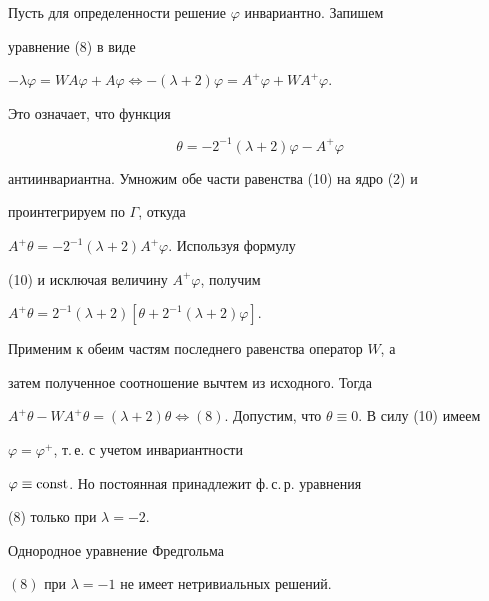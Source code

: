 \begin{pf}


Пусть для определенности решение $\varphi$  инвариантно. Запишем


уравнение (8) в виде


$-\lambda\varphi=WA\varphi+A\varphi \Longleftrightarrow


-(\lambda+2)\varphi=A^{+}\varphi+WA^{+}\varphi$.


Это означает, что функция


\begin{equation}


\theta=-2^{-1}(\lambda+2)\varphi-A^{+}\varphi


\end{equation}


антиинвариантна. Умножим обе части равенства (10) на ядро (2) и


проинтегрируем по $\Gamma$, откуда


$A^{+}\theta=-2^{-1}(\lambda+2)A^{+}\varphi$. Используя формулу


(10) и исключая величину $A^{+}\varphi$, получим


$A^{+}\theta=2^{-1}(\lambda+2)[\theta+2^{-1}(\lambda+2)\varphi]$.


Применим к обеим частям последнего равенства оператор $W$, а


затем полученное соотношение вычтем из исходного. Тогда


$A^{+}\theta-WA^{+}\theta=(\lambda+2)\theta \Longleftrightarrow


(8)$. Допустим, что $\theta\equiv 0$. В силу (10) имеем


$\varphi=\varphi^{+}$, т.\,е. с учетом инвариантности


$\varphi\equiv \operatorname{const}$. Но постоянная принадлежит ф.\,с.\,р. уравнения


(8) только при $\lambda=-2$.


\end{pf}








\begin{lem}


Однородное уравнение Фредгольма


$(8)$ при $\lambda=-1$ не имеет нетривиальных решений.


\end{lem}








